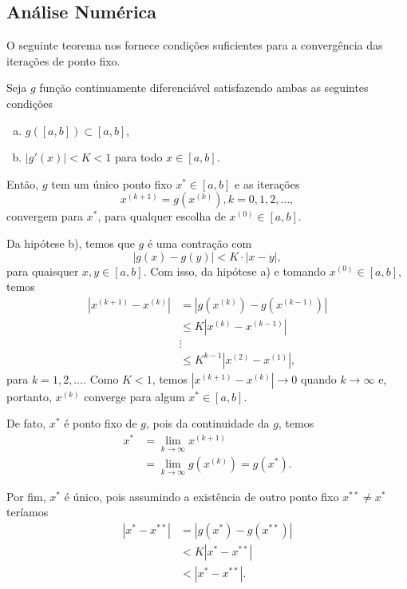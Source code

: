 \subsection{Análise Numérica}

O seguinte teorema nos fornece condições suficientes para a convergência das iterações de ponto fixo.

\begin{teo}\label{cap_eq1d_sec_pfixo:teo:pfixo}
  Seja $g$ função continuamente diferenciável satisfazendo ambas as seguintes condições
  \begin{enumerate}[a)]
  \item $g\left([a, b]\right) \subset [a, b]$,
  \item $|g'(x)|<K<1$ para todo $x\in [a, b]$.
  \end{enumerate}
  Então, $g$ tem um único ponto fixo $x^*\in [a, b]$ e as iterações
  \begin{equation}
    x^{(k+1)}= g\left(x^{(k)}\right), k=0, 1, 2, \ldots,
  \end{equation}
  convergem para $x^*$, para qualquer escolha de $x^{(0)}\in [a, b]$.
\end{teo}
\begin{dem}
  Da hipótese b), temos que $g$ é uma contração com
  \begin{equation}
    \left|g(x) - g(y)\right| < K\cdot |x - y|,
  \end{equation}
  para quaisquer $x,y\in [a, b]$. Com isso, da hipótese a) e tomando $x^{(0)}\in [a, b]$, temos
  \begin{align}
    \left|x^{(k+1)} - x^{(k)}\right| &= \left|g(x^{(k)}) - g(x^{(k-1)})\right|\\
                                     &\leq K \left|x^{(k)} - x^{(k-1)}\right|\\
                                     &\vdots \nonumber\\
                                     &\leq K^{k-1}\left|x^{(2)}-x^{(1)}\right|,
  \end{align}
  para $k=1, 2, \ldots$. Como $K<1$, temos $\left|x^{(k+1)}-x^{(k)}\right|\to 0$ quando $k\to\infty$ e, portanto, $x^{(k)}$ converge para algum $x^*\in [a, b]$.
  
  De fato, $x^*$ é ponto fixo de $g$, pois da continuidade da $g$, temos
  \begin{align}
    x^* &= \lim_{k\to\infty} x^{(k+1)}\\
        &= \lim_{k\to\infty} g(x^{(k)}) = g(x^*).
  \end{align}
  
  Por fim, $x^*$ é único, pois assumindo a existência de outro ponto fixo $x^{**}\neq x^*$ teríamos
  \begin{align}
    |x^* - x^{**}| &= |g(x^*) - g(x^{**})| \\
                   &< K|x^* - x^{**}|\\
                   &< |x^* - x^{**}|.
  \end{align}
\end{dem}

